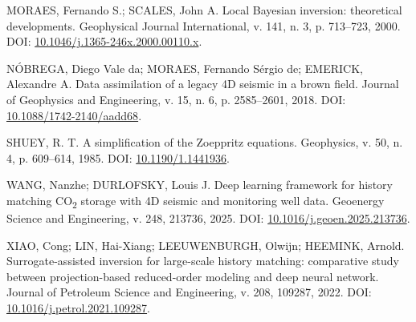 \documentclass[12pt,a4paper]{article}
\begin{document}
\noindent MORAES, Fernando S.; SCALES, John A. Local Bayesian inversion: theoretical developments. Geophysical Journal International, v. 141, n. 3, p. 713--723, 2000. DOI: \href{https://doi.org/10.1046/j.1365-246x.2000.00110.x}{10.1046/j.1365-246x.2000.00110.x}.\par
\noindent NÓBREGA, Diego Vale da; MORAES, Fernando Sérgio de; EMERICK, Alexandre A. Data assimilation of a legacy 4D seismic in a brown field. Journal of Geophysics and Engineering, v. 15, n. 6, p. 2585--2601, 2018. DOI: \href{https://doi.org/10.1088/1742-2140/aadd68}{10.1088/1742-2140/aadd68}.\par
\noindent SHUEY, R. T. A simplification of the Zoeppritz equations. Geophysics, v. 50, n. 4, p. 609--614, 1985. DOI: \href{https://doi.org/10.1190/1.1441936}{10.1190/1.1441936}.\par
\noindent WANG, Nanzhe; DURLOFSKY, Louis J. Deep learning framework for history matching CO\textsubscript{2} storage with 4D seismic and monitoring well data. Geoenergy Science and Engineering, v. 248, 213736, 2025. DOI: \href{https://doi.org/10.1016/j.geoen.2025.213736}{10.1016/j.geoen.2025.213736}.\par
\noindent XIAO, Cong; LIN, Hai-Xiang; LEEUWENBURGH, Olwijn; HEEMINK, Arnold. Surrogate-assisted inversion for large-scale history matching: comparative study between projection-based reduced-order modeling and deep neural network. Journal of Petroleum Science and Engineering, v. 208, 109287, 2022. DOI: \href{https://doi.org/10.1016/j.petrol.2021.109287}{10.1016/j.petrol.2021.109287}.\par
\end{document}
